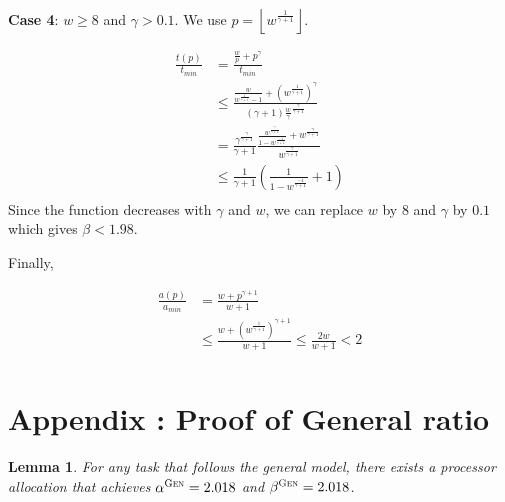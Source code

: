 \documentclass{article}
\newtheorem{lemma}{Lemma}
\newcommand\GEN{\textsc{Gen}\xspace}
\begin{document}
\textbf{Case 4}:  $w \geq 8$ and $\gamma > 0.1$.
We use $p=\left\lfloor w^{\frac{1}{\gamma+1}} \right\rfloor$.

\begin{align*}
\frac{t(p)}{t_{min}}&=\frac{\frac{w}{p}+p^\gamma}{t_{min}} \\
&\leq \frac{\frac{w}{ w^{\frac{1}{\gamma+1}}-1}+\left( w^{\frac{1}{\gamma+1}}\right)^\gamma}{ \left( \gamma+1\right)\frac{w}{\gamma} ^{\frac{\gamma}{\gamma+1}}} \\
&= \frac{\gamma^{\frac{\gamma}{\gamma+1}}}{\gamma+1} \frac{\frac{w^{\frac{\gamma}{\gamma+1}}}{1-w^\frac{-1}{\gamma+1}}+w^{\frac{\gamma}{\gamma+1}}}{ w^{\frac{\gamma}{\gamma+1}}} \\
&\leq \frac{1}{\gamma+1}\left( \frac{1}{1-w^\frac{-1}{\gamma+1}}+1\right) \\
\end{align*}
Since the function decreases with $\gamma$ and $w$, we can replace $w$ by $8$ and $\gamma$ by $0.1$ which gives $\beta<1.98$.

Finally, 

\begin{align*}
\frac{a(p)}{a_{min}} &= \frac{w+p^{\gamma+1}}{w+1} \\
&\leq \frac{w+\left(w^{\frac{1}{\gamma+1}}\right)^{\gamma+1}}{w+1}\leq \frac{2w}{w+1}<2\\
\end{align*}

\FloatBarrier 
\newpage

\section{Appendix : Proof of General ratio}


\begin{lemma}\label{lem.general}
For any task that follows the general model, there exists a processor allocation that achieves $\alpha^{\GEN}=2.018
$ and $\beta^{\GEN}=2.018$.
\end{lemma}
\end{document}

